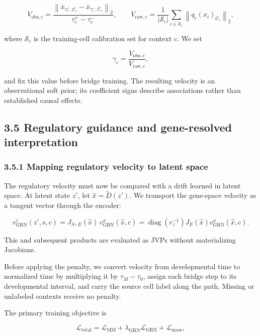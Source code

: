 \documentclass[
  11pt,
  letterpaper,
]{article}
\begin{document}
\[
V_{\mathrm{obs},c}
=\frac{
\left\lVert
\overline x_{\tau_c^+,\mathcal C_c}-\overline x_{\tau_c^-,\mathcal C_c}
\right\rVert_2
}{\tau_c^+-\tau_c^-},
\qquad
V_{\mathrm{raw},c}
=\frac{1}{|\mathcal S_c|}
\sum_{i\in\mathcal S_c}
\left\lVert q_c(x_i)_{\mathcal C_c}\right\rVert_2,
\]

where \(\mathcal S_c\) is the training-cell calibration set for context
\(c\). We set

\[
\gamma_c=\frac{V_{\mathrm{obs},c}}{V_{\mathrm{raw},c}},
\]

and fix this value before bridge training. The resulting velocity is an
observational soft prior; its coefficient signs describe associations
rather than established causal effects.

\subsection{3.5 Regulatory guidance and gene-resolved
interpretation}\label{regulatory-guidance-and-gene-resolved-interpretation}

\subsubsection{3.5.1 Mapping regulatory velocity to latent
space}\label{mapping-regulatory-velocity-to-latent-space}

The regulatory velocity must now be compared with a drift learned in
latent space. At latent state \(z'\), let
\(\widehat x=\widetilde D(z')\). We transport the gene-space velocity as
a tangent vector through the encoder:

\[
v_{\mathrm{GRN}}^z(z',s,c)
=J_{S\circ E}(\widehat x)\,v_{\mathrm{GRN}}^x(\widehat x,c)
=\operatorname{diag}(r_z^{-1})J_E(\widehat x)
  v_{\mathrm{GRN}}^x(\widehat x,c).
\]

This and subsequent products are evaluated as JVPs without materializing
Jacobians.

Before applying the penalty, we convert velocity from developmental time
to normalized time by multiplying it by \(\tau_M-\tau_0\), assign each
bridge step to its developmental interval, and carry the source cell
label along the path. Missing or unlabeled contexts receive no penalty.

The primary training objective is

\[
\mathcal{L}_{\mathrm{total}}
=\mathcal{L}_{\mathrm{MM}}
+\lambda_{\mathrm{GRN}}\mathcal{L}_{\mathrm{GRN}}
+\mathcal{L}_{\mathrm{mass}},
\]
\end{document}
